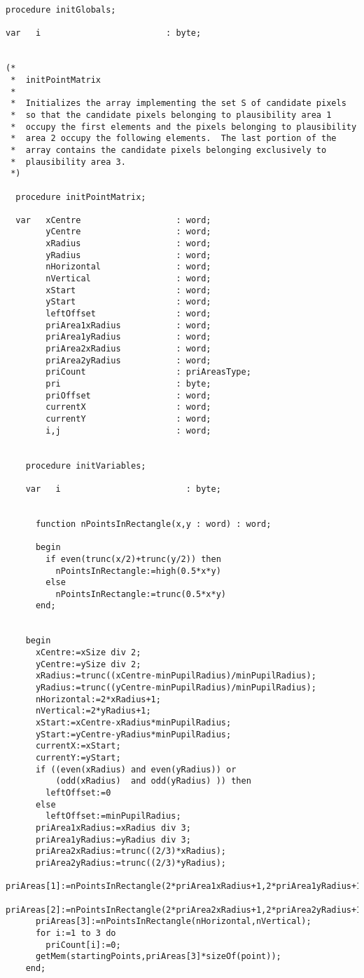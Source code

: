 \begin{verbatim}
procedure initGlobals;

var   i                         : byte;


(*
 *  initPointMatrix
 *
 *  Initializes the array implementing the set S of candidate pixels
 *  so that the candidate pixels belonging to plausibility area 1
 *  occupy the first elements and the pixels belonging to plausibility
 *  area 2 occupy the following elements.  The last portion of the
 *  array contains the candidate pixels belonging exclusively to
 *  plausibility area 3.
 *)

  procedure initPointMatrix;

  var   xCentre                   : word;
        yCentre                   : word;
        xRadius                   : word;
        yRadius                   : word;
        nHorizontal               : word;
        nVertical                 : word;
        xStart                    : word;
        yStart                    : word;
        leftOffset                : word;
        priArea1xRadius           : word;
        priArea1yRadius           : word;
        priArea2xRadius           : word;
        priArea2yRadius           : word;
        priCount                  : priAreasType;
        pri                       : byte;
        priOffset                 : word;
        currentX                  : word;
        currentY                  : word;
        i,j                       : word;


    procedure initVariables;

    var   i                         : byte;


      function nPointsInRectangle(x,y : word) : word;

      begin
        if even(trunc(x/2)+trunc(y/2)) then
          nPointsInRectangle:=high(0.5*x*y)
        else
          nPointsInRectangle:=trunc(0.5*x*y)
      end;


    begin
      xCentre:=xSize div 2;
      yCentre:=ySize div 2;
      xRadius:=trunc((xCentre-minPupilRadius)/minPupilRadius);
      yRadius:=trunc((yCentre-minPupilRadius)/minPupilRadius);
      nHorizontal:=2*xRadius+1;
      nVertical:=2*yRadius+1;
      xStart:=xCentre-xRadius*minPupilRadius;
      yStart:=yCentre-yRadius*minPupilRadius;
      currentX:=xStart;
      currentY:=yStart;
      if ((even(xRadius) and even(yRadius)) or
          (odd(xRadius)  and odd(yRadius) )) then
        leftOffset:=0
      else
        leftOffset:=minPupilRadius;
      priArea1xRadius:=xRadius div 3;
      priArea1yRadius:=yRadius div 3;
      priArea2xRadius:=trunc((2/3)*xRadius);
      priArea2yRadius:=trunc((2/3)*yRadius);
      priAreas[1]:=nPointsInRectangle(2*priArea1xRadius+1,2*priArea1yRadius+1);
      priAreas[2]:=nPointsInRectangle(2*priArea2xRadius+1,2*priArea2yRadius+1);
      priAreas[3]:=nPointsInRectangle(nHorizontal,nVertical);
      for i:=1 to 3 do
        priCount[i]:=0;
      getMem(startingPoints,priAreas[3]*sizeOf(point));
    end;



\end{verbatim}
